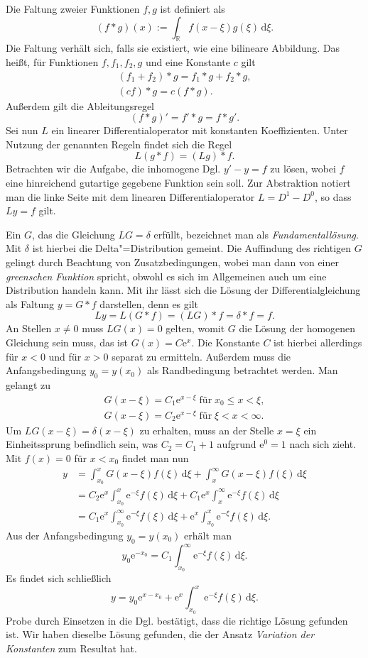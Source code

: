 \documentclass[a4paper,10pt,fleqn,twocolumn,twoside,dvipdfmx]{scrartcl}
\theoremstyle{rmbox}
\newcommand{\ee}{\mathrm{e}}
\newcommand{\R}{\mathbb R}
\begin{document}
\noindent
Die Faltung zweier Funktionen $f,g$ ist definiert als
\[(f*g)(x) := \int_\R f(x-\xi)g(\xi)\,\mathrm d\xi.\]
Die Faltung verhält sich, falls sie existiert, wie eine bilineare
Abbildung. Das heißt, für Funktionen $f,f_1,f_2,g$ und eine
Konstante $c$ gilt
\begin{gather*}
(f_1+f_2)*g = f_1*g + f_2*g,\\
(c f)*g = c(f*g).
\end{gather*}
Außerdem gilt die Ableitungsregel
\[(f*g)' = f'*g = f*g'.\]
Sei nun $L$ ein linearer Differentialoperator mit konstanten
Koeffizienten. Unter Nutzung der genannten Regeln findet sich die
Regel
\[L(g*f) = (Lg)*f.\]
Betrachten wir die Aufgabe, die inhomogene Dgl. $y' - y = f$ zu lösen,
wobei $f$ eine hinreichend gutartige gegebene Funktion sein soll.
Zur Abstraktion notiert man die linke Seite mit dem linearen
Differentialoperator $L=D^1-D^0$, so dass $Ly = f$ gilt.

Ein $G$, das die Gleichung $LG = \delta$ erfüllt, bezeichnet man als
\emph{Fundamentallösung}. Mit $\delta$ ist hierbei die
Delta"=Distribution gemeint. Die Auffindung des richtigen
$G$ gelingt durch Beachtung von Zusatzbedingungen, wobei man dann
von einer \emph{greenschen Funktion} spricht, obwohl es sich im
Allgemeinen auch um eine Distribution handeln kann. Mit ihr lässt sich
die Lösung der Differentialgleichung als Faltung $y = G*f$ darstellen,
denn es gilt
\[Ly = L(G*f) = (LG)*f = \delta*f = f.\]
An Stellen $x\ne 0$ muss $LG(x) = 0$ gelten, womit $G$ die Lösung der
homogenen Gleichung sein muss, das ist $G(x)=C\ee^x$. Die Konstante $C$
ist hierbei allerdings für $x<0$ und für $x>0$ separat zu ermitteln.
Außerdem muss die Anfangsbedingung $y_0=y(x_0)$ als Randbedingung
betrachtet werden. Man gelangt zu
\begin{gather*}
G(x-\xi) = C_1\ee^{x-\xi}\;\text{für}\; x_0\le x<\xi,\\
G(x-\xi) = C_2\ee^{x-\xi}\;\text{für}\; \xi < x < \infty.
\end{gather*}
Um $LG(x-\xi)=\delta(x-\xi)$ zu erhalten, muss an der Stelle $x=\xi$ ein
Einheitssprung befindlich sein, was $C_2 = C_1 + 1$ aufgrund
$\ee^0=1$ nach sich zieht. Mit $f(x)=0$ für $x<x_0$ findet man nun
\begin{align*}
y &= \int_{x_0}^x G(x-\xi)f(\xi)\,\mathrm d\xi + \int_x^\infty G(x-\xi)f(\xi)\,\mathrm d\xi\\
&= C_2\ee^x\int_{x_0}^x \ee^{-\xi} f(\xi)\,\mathrm d\xi + C_1\ee^x\int_x^\infty \ee^{-\xi}f(\xi)\,\mathrm d\xi\\
&= C_1\ee^x\int_{x_0}^\infty \ee^{-\xi} f(\xi)\,\mathrm d\xi + \ee^x\int_{x_0}^x\ee^{-\xi} f(\xi)\,\mathrm d\xi.
\end{align*}
Aus der Anfangsbedingung $y_0=y(x_0)$ erhält man
\[y_0\ee^{-x_0} = C_1\int_{x_0}^\infty \ee^{-\xi} f(\xi)\,\mathrm d\xi.\]
Es findet sich schließlich
\[y = y_0\ee^{x-x_0} + \ee^x\int_{x_0}^x \ee^{-\xi}f(\xi)\,\mathrm d\xi.\]
Probe durch Einsetzen in die Dgl. bestätigt, dass die richtige
Lösung gefunden ist. Wir haben dieselbe Lösung gefunden, die der
Ansatz \emph{Variation der Konstanten} zum Resultat hat.
\end{document}
